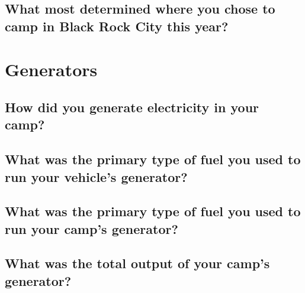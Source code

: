 \documentclass[
]{book}
\begin{document}
\hypertarget{what-most-determined-where-you-chose-to-camp-in-black-rock-city-this-year}{%
\subsection{What most determined where you chose to camp in Black Rock City this year?}\label{what-most-determined-where-you-chose-to-camp-in-black-rock-city-this-year}}

\hypertarget{generators}{%
\section{Generators}\label{generators}}

\hypertarget{how-did-you-generate-electricity-in-your-camp}{%
\subsection{How did you generate electricity in your camp?}\label{how-did-you-generate-electricity-in-your-camp}}

\hypertarget{what-was-the-primary-type-of-fuel-you-used-to-run-your-vehicles-generator}{%
\subsection{What was the primary type of fuel you used to run your vehicle's generator?}\label{what-was-the-primary-type-of-fuel-you-used-to-run-your-vehicles-generator}}

\hypertarget{what-was-the-primary-type-of-fuel-you-used-to-run-your-camps-generator}{%
\subsection{What was the primary type of fuel you used to run your camp's generator?}\label{what-was-the-primary-type-of-fuel-you-used-to-run-your-camps-generator}}

\hypertarget{what-was-the-total-output-of-your-camps-generator}{%
\subsection{What was the total output of your camp's generator?}\label{what-was-the-total-output-of-your-camps-generator}}

  
\end{document}
